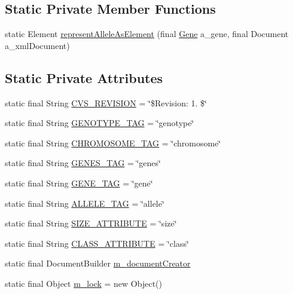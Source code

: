 \subsection*{Static Private Member Functions}
\begin{DoxyCompactItemize}
\item 
static Element \hyperlink{classorg_1_1jgap_1_1xml_1_1_x_m_l_manager_a8068657008c89a359ee3e85a3819b89a}{represent\-Allele\-As\-Element} (final \hyperlink{interfaceorg_1_1jgap_1_1_gene}{Gene} a\-\_\-gene, final Document a\-\_\-xml\-Document)
\end{DoxyCompactItemize}
\subsection*{Static Private Attributes}
\begin{DoxyCompactItemize}
\item 
static final String \hyperlink{classorg_1_1jgap_1_1xml_1_1_x_m_l_manager_a472779c969fd8ec16084c56ef5f1397f}{C\-V\-S\-\_\-\-R\-E\-V\-I\-S\-I\-O\-N} = \char`\"{}\$Revision\-: 1. \$\char`\"{}
\item 
static final String \hyperlink{classorg_1_1jgap_1_1xml_1_1_x_m_l_manager_a161a14a8472a0da0f73dca084d99100e}{G\-E\-N\-O\-T\-Y\-P\-E\-\_\-\-T\-A\-G} = \char`\"{}genotype\char`\"{}
\item 
static final String \hyperlink{classorg_1_1jgap_1_1xml_1_1_x_m_l_manager_a5bce59b72a6ba0a315bc7be777b48647}{C\-H\-R\-O\-M\-O\-S\-O\-M\-E\-\_\-\-T\-A\-G} = \char`\"{}chromosome\char`\"{}
\item 
static final String \hyperlink{classorg_1_1jgap_1_1xml_1_1_x_m_l_manager_a40c3dda632d4fd1e9cd66265ad6af0d1}{G\-E\-N\-E\-S\-\_\-\-T\-A\-G} = \char`\"{}genes\char`\"{}
\item 
static final String \hyperlink{classorg_1_1jgap_1_1xml_1_1_x_m_l_manager_ad87772071a8f4c4182e98c5db25fdb3a}{G\-E\-N\-E\-\_\-\-T\-A\-G} = \char`\"{}gene\char`\"{}
\item 
static final String \hyperlink{classorg_1_1jgap_1_1xml_1_1_x_m_l_manager_a69a54996f8e2e16cbadffe808f28afa1}{A\-L\-L\-E\-L\-E\-\_\-\-T\-A\-G} = \char`\"{}allele\char`\"{}
\item 
static final String \hyperlink{classorg_1_1jgap_1_1xml_1_1_x_m_l_manager_a25640fa195b8f7899ff3d52f32f47a18}{S\-I\-Z\-E\-\_\-\-A\-T\-T\-R\-I\-B\-U\-T\-E} = \char`\"{}size\char`\"{}
\item 
static final String \hyperlink{classorg_1_1jgap_1_1xml_1_1_x_m_l_manager_aa7b5673bbde0846b7f6a4a5ed087cdfc}{C\-L\-A\-S\-S\-\_\-\-A\-T\-T\-R\-I\-B\-U\-T\-E} = \char`\"{}class\char`\"{}
\item 
static final Document\-Builder \hyperlink{classorg_1_1jgap_1_1xml_1_1_x_m_l_manager_a244be2fb6db3b4d0763d73c7ff42d675}{m\-\_\-document\-Creator}
\item 
static final Object \hyperlink{classorg_1_1jgap_1_1xml_1_1_x_m_l_manager_a29ebbee4381287f18885e3d89f17221d}{m\-\_\-lock} = new Object()
\end{DoxyCompactItemize}


